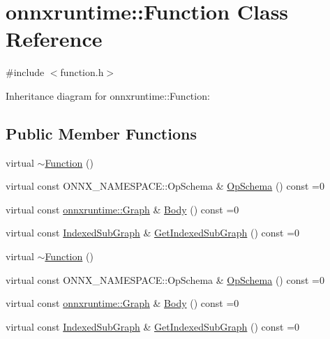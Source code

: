 \hypertarget{classonnxruntime_1_1Function}{}\section{onnxruntime\+:\+:Function Class Reference}
\label{classonnxruntime_1_1Function}


{\ttfamily \#include $<$function.\+h$>$}



Inheritance diagram for onnxruntime\+:\+:Function\+:
\subsection*{Public Member Functions}
\begin{DoxyCompactItemize}
\item 
virtual \mbox{\hyperlink{classonnxruntime_1_1Function_a53fa3b8484424aaeadf593d248be1dcf}{$\sim$\+Function}} ()
\item 
virtual const O\+N\+N\+X\+\_\+\+N\+A\+M\+E\+S\+P\+A\+C\+E\+::\+Op\+Schema \& \mbox{\hyperlink{classonnxruntime_1_1Function_aad1b1f67422088275cb4ce6470aa906a}{Op\+Schema}} () const =0
\item 
virtual const \mbox{\hyperlink{classonnxruntime_1_1Graph}{onnxruntime\+::\+Graph}} \& \mbox{\hyperlink{classonnxruntime_1_1Function_a08b5712ccba430871c186da1c8670257}{Body}} () const =0
\item 
virtual const \mbox{\hyperlink{structonnxruntime_1_1IndexedSubGraph}{Indexed\+Sub\+Graph}} \& \mbox{\hyperlink{classonnxruntime_1_1Function_a017f5155e74c32b1e3cd42e6c0f94d91}{Get\+Indexed\+Sub\+Graph}} () const =0
\item 
virtual \mbox{\hyperlink{classonnxruntime_1_1Function_a53fa3b8484424aaeadf593d248be1dcf}{$\sim$\+Function}} ()
\item 
virtual const O\+N\+N\+X\+\_\+\+N\+A\+M\+E\+S\+P\+A\+C\+E\+::\+Op\+Schema \& \mbox{\hyperlink{classonnxruntime_1_1Function_aad1b1f67422088275cb4ce6470aa906a}{Op\+Schema}} () const =0
\item 
virtual const \mbox{\hyperlink{classonnxruntime_1_1Graph}{onnxruntime\+::\+Graph}} \& \mbox{\hyperlink{classonnxruntime_1_1Function_a08b5712ccba430871c186da1c8670257}{Body}} () const =0
\item 
virtual const \mbox{\hyperlink{structonnxruntime_1_1IndexedSubGraph}{Indexed\+Sub\+Graph}} \& \mbox{\hyperlink{classonnxruntime_1_1Function_a017f5155e74c32b1e3cd42e6c0f94d91}{Get\+Indexed\+Sub\+Graph}} () const =0
\end{DoxyCompactItemize}


